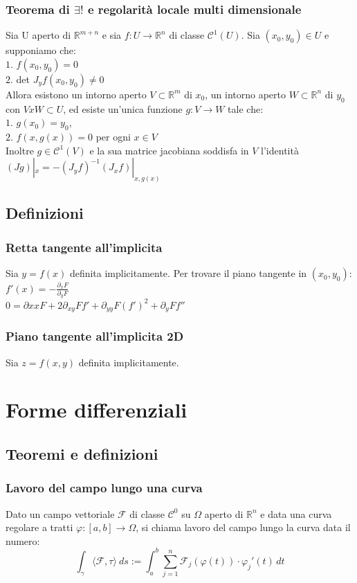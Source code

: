 \documentclass{article} %
\begin{document}
    \subsubsection*{Teorema di $\exists !$ e regolarità locale multi dimensionale}
    Sia U aperto di $\mathbb{R}^{m+n}$ e sia $f:U \to \mathbb{R}^n$ di classe $\mathcal{C}^1\left(U\right)$. Sia $(x_0,y_0) \in U$ e supponiamo che: \\
    $1.$ $f(x_0,y_0)=0$ \\
    $2.$ det $J_{y}f(x_0,y_0) \neq 0$ \\
    Allora esistono un intorno aperto $V \subset \mathbb{R}^m$ di $x_0$, un intorno aperto $W \subset \mathbb{R}^n$ di $y_0$ con $V x W \subset U$, ed esiste un'unica funzione $g: V \to W$ tale che: \\
    $1.$ $g(x_0)=y_0$, \\
    $2.$ $f(x,g(x))=0$ per ogni $x \in V$ \\
    Inoltre $g \in \mathcal{C}^1(V)$ e la sua matrice jacobiana soddisfa in $V$ l'identità \\
    $(Jg)|_x = -(J_yf)^{-1}(J_xf)|_{x,g(x)}$ 

    \subsection{Definizioni}
    \subsubsection*{Retta tangente all'implicita}
    Sia $y=f(x)$ definita implicitamente. Per trovare il piano tangente in $(x_0,y_0)$:
    $f'(x)=-\frac{\partial_x F}{\partial_y F}$ \\
    $0 = \partial{xx}F + 2 \partial_{xy} F f' + \partial_{yy} F  (f')^2 + \partial_y F f''$
    \subsubsection*{Piano tangente all'implicita 2D}
    Sia $z=f(x,y)$ definita implicitamente. 

    \section{Forme differenziali}
    \subsection{Teoremi e definizioni}
    \subsubsection*{Lavoro del campo lungo una curva}
    Dato un campo vettoriale $\mathcal{F} $ di classe $ \mathcal{C} ^0 $ su $\Omega$ aperto di $ \mathbb{R} ^n $
    e data una curva regolare a tratti $\varphi:[a,b]\to \Omega $, si chiama lavoro del campo lungo la curva data il numero:
    $$ \int _\gamma \langle \mathcal{F} , \tau \rangle \  ds := \int_{a}^{b} \sum_{j = 1}^{n}  \mathcal{F}_j(\varphi (t)) \cdot \varphi_j ' (t) \,dt  $$
\end{document}
